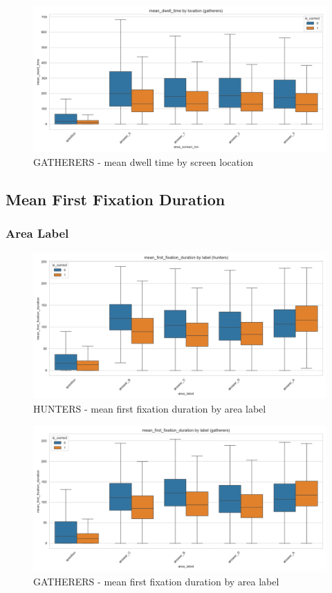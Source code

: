 \documentclass{article}
\begin{document}
\begin{figure}[H]
    \centering
    \includegraphics[width=0.8\linewidth]{plots/boxplots/boxplot_area_screen_loc_mean_dwell_time_gatherers.png}
    \caption{GATHERERS - mean dwell time by screen location}
    \label{fig:dt_gath_sl}
\end{figure}


\subsection{Mean First Fixation Duration}
\subsubsection{Area Label}

\begin{figure}[H]
    \centering
    \includegraphics[width=0.8\linewidth]{plots/boxplots/boxplot_area_label_mean_first_fixation_duration_hunters.png}
    \caption{HUNTERS - mean first fixation duration by area label}
    \label{fig:ff_hunt_al}
\end{figure}

\begin{figure}[H]
    \centering
    \includegraphics[width=0.8\linewidth]{plots/boxplots/boxplot_area_label_mean_first_fixation_duration_gatherers.png}
    \caption{GATHERERS - mean first fixation duration by area label}
    \label{fig:ff_gath_al}
\end{figure}
\end{document}
